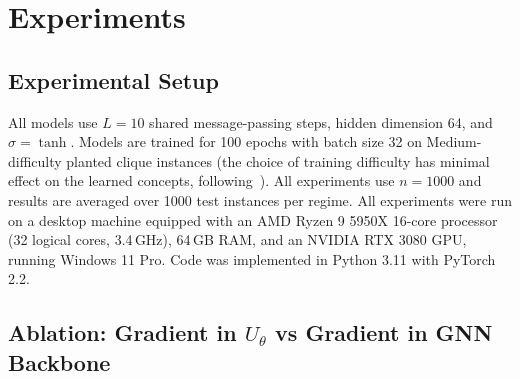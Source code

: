 \documentclass[11pt]{article}
\newcommand{\change}[1]{{\color{red}#1}}
\theoremstyle{plain}
\theoremstyle{definition}
\theoremstyle{remark}
\begin{document}
\section{Experiments}
\label{sec:experiments}

\subsection{Experimental Setup}
All models use $L=10$ shared message-passing steps, hidden dimension $64$, and
$\sigma = \tanh$. Models are trained for 100 epochs with batch size 32 on
Medium-difficulty planted clique instances (the choice of training difficulty has
minimal effect on the learned concepts, following~\citet{shoham2026ltr}).
\change{All experiments use $n=1000$ and results are averaged over 1000 test
instances per regime.} All experiments were run on a desktop machine equipped with an AMD Ryzen 9
5950X 16-core processor (32 logical cores, 3.4\,GHz), 64\,GB RAM, and an NVIDIA RTX
3080 GPU, running Windows 11 Pro. Code was implemented in Python 3.11 with PyTorch 2.2.

\subsection{Ablation: Gradient in $U_\theta$ vs Gradient in GNN Backbone}
\label{sec:ablation}
\end{document}
